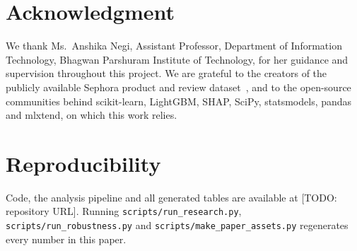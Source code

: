 \documentclass[11pt,a4paper]{article}
\newcommand{\todo}[1]{{\color{red}[TODO: #1]}}
\newcommand{\draft}[1]{{\color{blue!70!black}#1}}
\begin{document}
\section{Acknowledgment}
\draft{We thank Ms.\ Anshika Negi, Assistant Professor, Department of Information Technology, Bhagwan Parshuram Institute of Technology, for her guidance and supervision throughout this project. We are grateful to the creators of the publicly available Sephora product and review dataset~\cite{sephoradata}, and to the open-source communities behind scikit-learn, LightGBM, SHAP, SciPy, statsmodels, pandas and mlxtend, on which this work relies.}

\section*{Reproducibility}
Code, the analysis pipeline and all generated tables are available at \todo{repository URL}. Running \texttt{scripts/run\_research.py}, \texttt{scripts/run\_robustness.py} and \texttt{scripts/make\_paper\_assets.py} regenerates every number in this paper.


\end{document}
